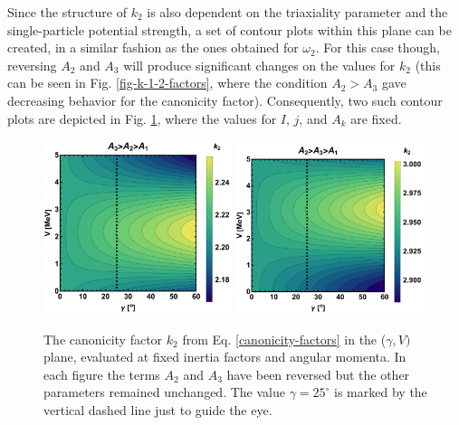 Since the structure of $k_2$ is also dependent on the triaxiality parameter and the single-particle potential strength, a set of contour plots within this plane can be created, in a similar fashion as the ones obtained for $\omega_2$. For this case though, reversing $A_2$ and $A_3$ will produce significant changes on the values for $k_2$ (this can be seen in Fig. \ref{fig-k-1-2-factors}, where the condition $A_2>A_3$ gave decreasing behavior for the canonicity factor). Consequently, two such contour plots are depicted in Fig. \ref{fig-k2-factor-contour}, where the values for $I$, $j$, and $A_k$ are fixed.
\begin{figure}
    \centering
    \includegraphics[width=0.49\textwidth]{Chapters/Figures/k2_CP.pdf}
    \includegraphics[width=0.49\textwidth]{Chapters/Figures/k2_reversed_CP.pdf}
    \caption{The canonicity factor $k_2$ from Eq. \ref{canonicity-factors} in the ($\gamma,V)$ plane, evaluated at fixed inertia factors and angular momenta. In each figure the terms $A_2$ and $A_3$ have been reversed but the other parameters remained unchanged. The value $\gamma=25^\circ$ is marked by the vertical dashed line just to guide the eye.}
    \label{fig-k2-factor-contour}
\end{figure}

